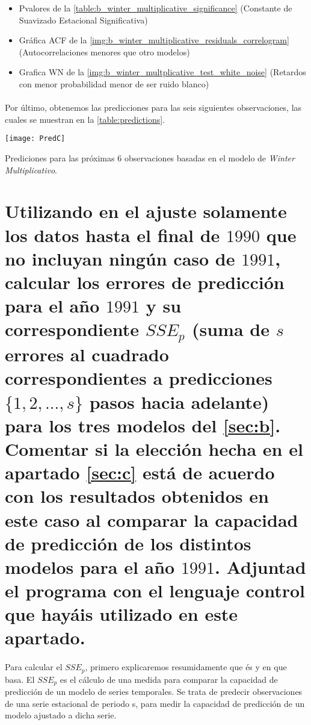 \documentclass[a4paper, spanish]{article}
\begin{document}
    \begin{itemize}
      \item Pvalores de la \autoref{table:b_winter_multiplicative_significance} (Constante de Suavizado Estacional Significativa)
      \item Gráfica ACF de la \autoref{img:b_winter_multiplicative_residuals_correlogram} (Autocorrelaciones menores que otro modelos)
      \item Grafica WN de la \autoref{img:b_winter_multplicative_test_white_noise} (Retardos con menor probabilidad menor de ser ruido blanco)
    \end{itemize}

    \paragraph{}
    Por último, obtenemos las predicciones para las seis siguientes observaciones, las cuales se muestran en la \autoref{table:predictions}.

    \begin{table}[htb!]
      \centering
      \texttt{[image: PredC]}
      \caption{Prediciones para las próximas $6$ observaciones basadas en el modelo de \emph{Winter Multiplicativo}.}
      \label{table:predictions}
    \end{table}

  \section{Utilizando en el ajuste solamente los datos hasta el final de $1990$ que no incluyan ningún caso de $1991$, calcular los errores de predicción para el año $1991$ y su correspondiente $SSE_p$ (suma de $s$ errores al cuadrado correspondientes a predicciones $\{1, 2, ..., s\}$ pasos hacia adelante) para los tres modelos del \autoref{sec:b}. Comentar si la elección hecha en el apartado \autoref{sec:c} está de acuerdo con los resultados obtenidos en este caso al comparar la capacidad de predicción de los distintos modelos para el año $1991$. Adjuntad el programa con el lenguaje control que hayáis utilizado en este apartado.}
  \label{sec:d}

    \paragraph{}
    Para calcular el $SSE_p$, primero explicaremos resumidamente que és y en que basa. El $SSE_p$ es el cálculo de una medida para comparar la capacidad de predicción de un modelo de series temporales.
    Se trata de predecir observaciones de una serie estacional de periodo s, para
    medir la capacidad de predicción de un modelo ajustado a dicha serie.
\end{document}
